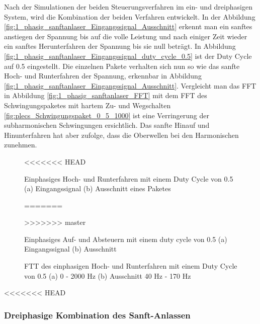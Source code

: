 Nach der Simulationen der beiden Steuerungsverfahren im ein- und dreiphasigen System, wird die Kombination der beiden Verfahren entwickelt. In der Abbildung \ref{fig:1_phasig_sanftanlaser_Eingangssignal_Ausschnitt} erkennt man ein sanftes anstiegen der Spannung bis auf die volle Leistung und nach einiger Zeit wieder ein sanftes Herunterfahren der Spannung bis sie null beträgt. In Abbildung \ref{fig:1_phasig_sanftanlaser_Eingangssignal_duty_cycle_0.5} ist der Duty Cycle auf 0.5 eingestellt. Die einzelnen Pakete verhalten sich nun so wie das sanfte Hoch- und Runterfahren der Spannung, erkennbar in Abbildung \ref{fig:1_phasig_sanftanlaser_Eingangssignal_Ausschnitt}. Vergleicht man das FFT in Abbildung \ref{fig:1_phasig_sanftanlaser_FFT} mit dem FFT des Schwingungspaketes mit hartem Zu- und Wegschalten \ref{fig:plecs_Schwingungspaket_0_5_1000} ist eine Verringerung der subharmonischen Schwingungen ersichtlich. Das sanfte Hinauf und Hinunterfahren hat aber zufolge, dass die Oberwellen bei den Harmonischen zunehmen. 

\begin{figure}[ht!]
	\centering
	\qquad
<<<<<<< HEAD
	\caption{Einphasiges Hoch- und Runterfahren mit einem Duty Cycle von 0.5 (a) Eingangssignal (b) Ausschnitt eines Paketes}
=======
	\caption{Einphasiges Auf- und Absteuern mit einem duty cycle von 0.5 (a) Eingangssignal (b) Ausschnitt}
>>>>>>> master
	\label{fig:einphasiges_Sanft_anlassen_Einganssignal}
\end{figure}

\begin{figure}[ht!]
	\centering
	\qquad
	\caption{FTT des einphasigen Hoch- und Runterfahren mit einem Duty Cycle von 0.5 (a) 0 - 2000 Hz (b) Ausschnitt 40 Hz - 170 Hz}
	\label{fig:einphasiges_Sanft_anlassen_FTT}
\end{figure}

<<<<<<< HEAD
\subsubsection{Dreiphasige Kombination des Sanft-Anlassen}

